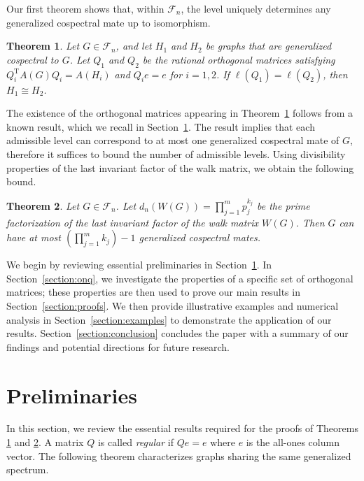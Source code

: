 \documentclass[12pt]{article}
\theoremstyle{plain}
\newtheorem{theorem}{Theorem}[section]
\theoremstyle{definition}
\newcommand{\trans}{^{\mathrm{T}}}
\begin{document}
Our first theorem shows that, within $\mathcal{F}_n$, the level uniquely determines any generalized cospectral mate up to isomorphism.

\begin{theorem}
\label{theorem:level-unique}
Let $G \in \mathcal{F}_n$, and let $H_1$ and $H_2$ be graphs that are generalized cospectral to $G$. Let $Q_1$ and $Q_2$ be the rational orthogonal matrices satisfying $Q_i\trans A(G) Q_i = A(H_i)$ and $Q_i e = e$ for $i=1,2$. If $\ell(Q_1) = \ell(Q_2)$, then $H_1 \cong H_2$.
\end{theorem}

The existence of the orthogonal matrices appearing in Theorem~\ref{theorem:level-unique} follows from a known result, which we recall in Section~\ref{section:prelim}. The result implies that each admissible level can correspond to at most one generalized cospectral mate of $G$, therefore it suffices to bound the number of admissible levels. Using divisibility properties of the last invariant factor of the walk matrix, we obtain the following bound.

\begin{theorem}
\label{theorem:main}
Let $G \in \mathcal{F}_n$. Let $d_n(W(G)) = \prod_{j=1}^m p_j^{k_j}$ be the prime factorization of the last invariant factor of the walk matrix $W(G)$. Then $G$ can have at most $\left(\prod_{j=1}^m k_j\right)-1$ generalized cospectral mates.
\end{theorem}

We begin by reviewing essential preliminaries in Section~\ref{section:prelim}. In Section~\ref{section:onq}, we investigate the properties of a specific set of orthogonal matrices; these properties are then used to prove our main results in Section~\ref{section:proofs}. We then provide illustrative examples and numerical analysis in Section~\ref{section:examples} to demonstrate the application of our results. Section~\ref{section:conclusion} concludes the paper with a summary of our findings and potential directions for future research.

\section{Preliminaries}
\label{section:prelim}
In this section, we review the essential results required for the proofs of Theorems \ref{theorem:level-unique} and \ref{theorem:main}. A matrix $Q$ is called \emph{regular} if $Qe=e$ where $e$ is the all-ones column vector. The following theorem characterizes graphs sharing the same generalized spectrum.
\end{document}
